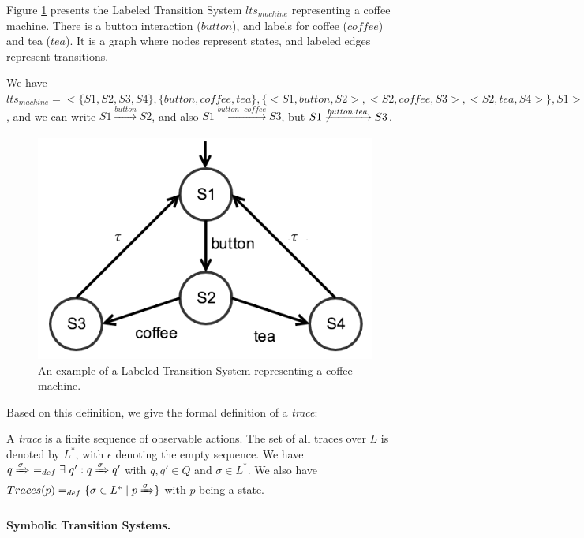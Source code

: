 \begin{example}
    Figure \ref{fig:lts-example} presents the Labeled Transition
    System $lts_{machine}$ representing a coffee machine. There
    is a button interaction ($button$), and labels for coffee
    ($coffee$) and tea ($tea$). It is a graph where nodes
    represent states, and labeled edges represent transitions.

    We have $lts_{machine} = <\{ S1, S2, S3, S4 \}, \{ button, coffee, tea
    \}, \{ <S1, button, S2>, <S2, coffee, S3>, <S2, tea, S4> \},
    S1>$, and we can write $S1 \xrightarrow[]{button} S2$, and
    also $S1 \xrightarrow[]{button \cdot coffee} S3$, but $S1
    \not\xrightarrow[]{button \cdot tea} S3$.

    \begin{figure}[ht]
        \begin{center}
            \includegraphics[width=0.6\linewidth]{figures/lts.png}
        \end{center}

        \caption{An example of a Labeled Transition System
        representing a coffee machine.}
        \label{fig:lts-example}
    \end{figure}
\end{example}

Based on this definition, we give the formal definition of a
\emph{trace}:

\begin{definition}[Trace]
    A \emph{trace} is a finite sequence of observable actions.
    The set of all traces over $L$ is denoted by $L^*$, with
    $\epsilon$ denoting the empty sequence.
    We have $q \xRightarrow{\sigma} ~=_{def} \exists ~q' : q
    \xRightarrow{\sigma} q'$ with $q, q' \in Q$ and $\sigma \in
    L^*$.
    We also have $Traces(p) =_{def} \{ \sigma \in L^* \mid p
    \xRightarrow{\sigma} \}$ with $p$ being a state.
\end{definition}

\paragraph{Symbolic Transition Systems.}
\label{sec:definitions:sts}

